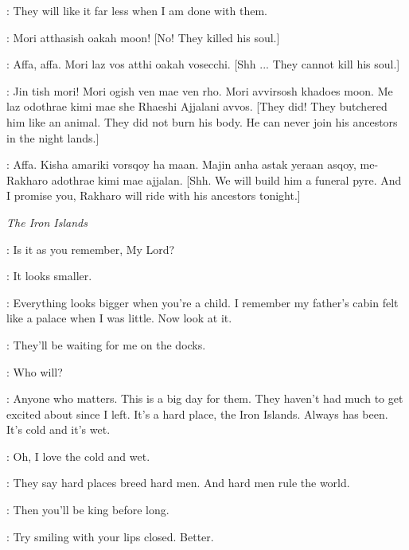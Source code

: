 \DAENERYS: They will like it far less when I am done with them.


\IRRI: Mori atthasish oakah moon! [No! They killed his soul.]

\DAENERYS: Affa, affa. Mori laz vos atthi oakah vosecchi. [Shh ... They cannot kill his soul.]

\IRRI: Jin tish mori! Mori ogish ven mae ven rho. Mori avvirsosh khadoes moon. Me laz odothrae kimi mae she Rhaeshi Ajjalani avvos. [They did! They butchered him like an animal. They did not burn his body. He can never join his ancestors in the night lands.]

\DAENERYS: Affa. Kisha amariki vorsqoy ha maan. Majin anha astak yeraan asqoy, me-Rakharo adothrae kimi mae ajjalan. [Shh. We will build him a funeral pyre. And I promise you, Rakharo will ride with his ancestors tonight.]


\scene

\textit{The Iron Islands}


\WOMAN: Is it as you remember, My Lord?

\THEON: It looks smaller.

\WOMAN: Everything looks bigger when you're a child. I remember my father's cabin felt like a palace when I was little. Now look at it.

\THEON: They'll be waiting for me on the docks.

\WOMAN: Who will?

\THEON: Anyone who matters. This is a big day for them. They haven't had much to get excited about since I left. It's a hard place, the Iron Islands. Always has been. It's cold and it's wet.

\WOMAN: Oh, I love the cold and wet.

\THEON: They say hard places breed hard men. And hard men rule the world.

\WOMAN: Then you'll be king before long.

\THEON: Try smiling with your lips closed. Better.

